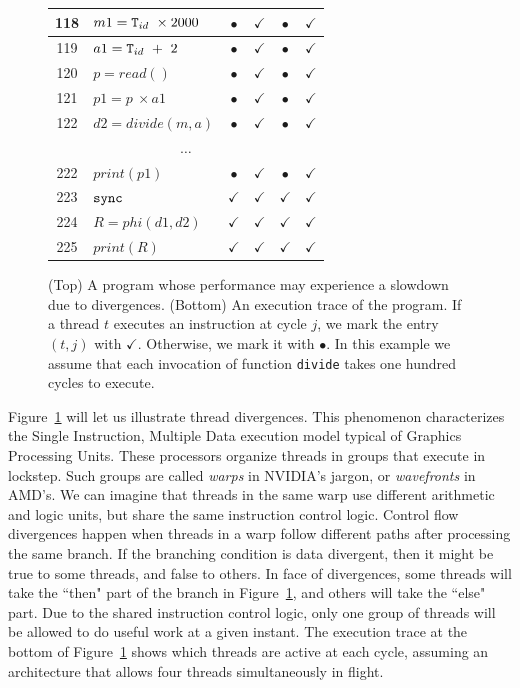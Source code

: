 \documentclass[times,10pt,twocolumn]{article}
\newcommand{\tid}{\mbox{\texttt{T}}_{id}}
\newcommand{\code}[1]{\mbox{\texttt{#1}}}
\begin{document}
\begin{figure}[b!]
\begin{center}
\begin{small}
\begin{tabular}{|c|l|c|c|c|c|}
118      & $ m1 = \tid \ \times 2000$ & $\bullet$    & $\checkmark$ & $\bullet$ & $\checkmark$ \\ \hline
119     & $ a1 = \tid \ + \ 2$        & $\bullet$    & $\checkmark$    & $\bullet$ & $\checkmark$ \\ \hline
120     & $ p = read()$ & $\bullet$    & $\checkmark$    & $\bullet$ & $\checkmark$ \\ \hline
121     & $ p1 = p \ \times a1$ & $\bullet$    & $\checkmark$ & $\bullet$ & $\checkmark$ \\ \hline
122     & $ d2 = divide(m, a)$        & $\bullet$    & $\checkmark$    & $\bullet$ & $\checkmark$ \\ \hline
\multicolumn{6}{c}{$\ldots$} \\ \hline
222      & $ print(p1)$ & $\bullet$    & $\checkmark$    & $\bullet$ & $\checkmark$ \\ \hline
223     & $ \code{sync}$        & $\checkmark$ & $\checkmark$ & $\checkmark$ & $\checkmark$ \\ \hline
224     & $ R = phi(d1, d2)$    & $\checkmark$ & $\checkmark$ & $\checkmark$ & $\checkmark$ \\ \hline
225     & $ print(R)$ & $\checkmark$    & $\checkmark$ & $\checkmark$ & $\checkmark$ \\ \hline
\end{tabular}

\end{small}
\end{center}
\caption{(Top) A program whose performance may experience a
slowdown due to divergences.
(Bottom) An execution trace of the program.
If a thread $t$ executes an instruction at cycle
$j$, we mark the entry $(t, j)$ with $\checkmark$.
Otherwise, we mark it with $\bullet$.
In this example we assume that each invocation of function \texttt{divide} takes
one hundred cycles to execute.}
\label{fig:exampleOrig}
\end{figure}

Figure~\ref{fig:exampleOrig} will let us illustrate thread divergences.
This phenomenon characterizes the Single Instruction, Multiple Data
execution model typical of Graphics Processing Units.
These processors organize threads in groups that execute in lockstep.
Such groups are called {\em warps} in NVIDIA's jargon, or {\em wavefronts} in
AMD's.
We can imagine that threads in the same warp use different arithmetic and
logic units, but share the same instruction control logic.
Control flow divergences happen when threads
in a warp follow different paths after processing the same branch.
If the branching condition is data divergent, then it might be true to some
threads, and false to others.
In face of divergences, some threads will take the ``then" part of the branch
in Figure~\ref{fig:exampleOrig}, and others will take the ``else" part.
Due to the shared instruction control logic, only one group
of threads will be allowed to do useful work at a given instant.
The execution trace at the bottom of Figure~\ref{fig:exampleOrig} shows
which threads are active at each cycle, assuming an architecture that allows
four threads simultaneously in flight.
\end{document}
